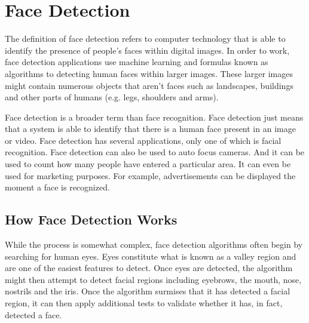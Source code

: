 \documentclass[sigconf]{acmart}
\begin{document}
\section{Face Detection}
The definition of face detection refers to computer technology that is able to identify the presence of people’s faces within digital images. In order to work, face detection applications use machine learning and formulas known as algorithms to detecting human faces within larger images. These larger images might contain numerous objects that aren’t faces such as landscapes, buildings and other parts of humans (e.g. legs, shoulders and arms).

Face detection is a broader term than face recognition. Face detection just means that a system is able to identify that there is a human face present in an image or video. Face detection has several applications, only one of which is facial recognition. Face detection can also be used to auto focus cameras. And it can be used to count how many people have entered a particular area. It can even be used for marketing purposes. For example, advertisements can be displayed the moment a face is recognized.

\subsection{How Face Detection Works}
While the process is somewhat complex, face detection algorithms often begin by searching for human eyes. Eyes constitute what is known as a valley region and are one of the easiest features to detect. Once eyes are detected, the algorithm might then attempt to detect facial regions including eyebrows, the mouth, nose, nostrils and the iris. Once the algorithm surmises that it has detected a facial region, it can then apply additional tests to validate whether it has, in fact, detected a face.
\end{document}
